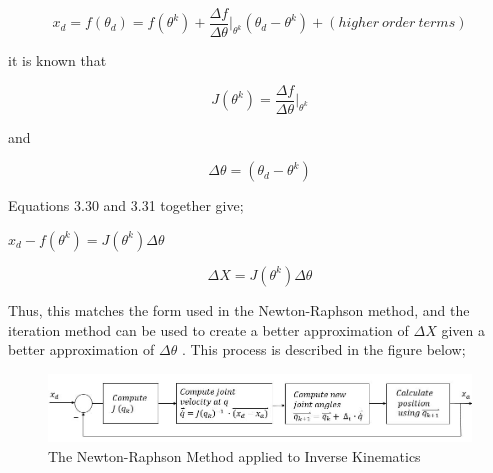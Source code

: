 \documentclass[12pt,openany,a4paper]{book}
\begin{document}
\vspace{\baselineskip}
\begin{equation}
x_d = f( \theta _d ) = f( \theta ^k ) + \frac{ \Delta f }{ \Delta \theta } |_{ \theta ^k } ( \theta_d - \theta^k ) + ( higher\ order\ terms )
\end{equation}

\vspace{\baselineskip}
it is known that

\vspace{\baselineskip}
\begin{equation}
J(\theta^k) = \frac{\Delta f}{\Delta \theta} |_{\theta^k}
\end{equation}

\vspace{\baselineskip}
and

\vspace{\baselineskip}
\begin{equation}
\Delta \theta = (\theta_d - \theta^k)
\end{equation}

\vspace{\baselineskip}
Equations 3.30 and 3.31 together give;

\vspace{\baselineskip}
\begin{center}
$x_d - f(\theta^k) = J(\theta^k) \Delta \theta$
\end{center}

\vspace{\baselineskip}
\begin{equation}
\Delta X = J(\theta^k) \Delta \theta
\end{equation}

\vspace{\baselineskip}
Thus, this matches the form used in the Newton-Raphson method, and the iteration method can be used to create a better approximation of $\Delta X$ given a better approximation of $\Delta \theta$ \cite{numericalMethodsVid}. This process is described in the figure below;

\begin{center}
\begin{figure}[htb]
  \includegraphics[width=1.08\linewidth]{Newton-Raphson_loop.jpg}
\caption{The Newton-Raphson Method applied to Inverse Kinematics}
\end{figure}
\end{center}
\end{document}
